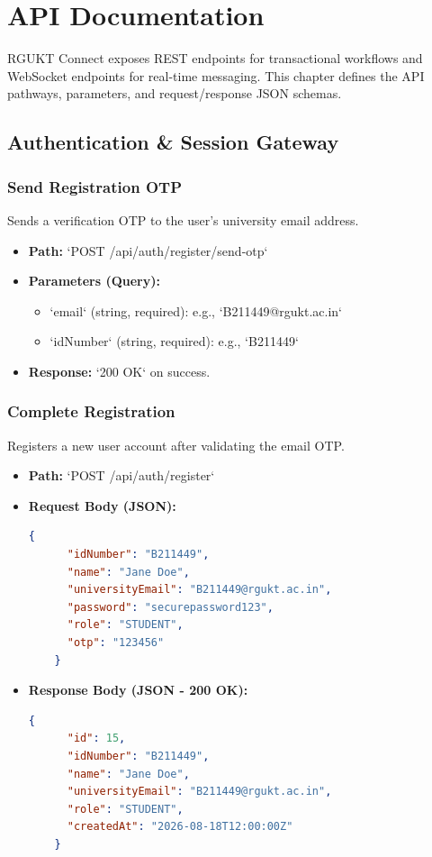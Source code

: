 \chapter{API Documentation}
\label{ch:api}

RGUKT Connect exposes REST endpoints for transactional workflows and WebSocket endpoints for real-time messaging. This chapter defines the API pathways, parameters, and request/response JSON schemas.

\section{Authentication \& Session Gateway}

\subsection{Send Registration OTP}
Sends a verification OTP to the user's university email address.
\begin{itemize}
    \item \textbf{Path:} `POST /api/auth/register/send-otp`
    \item \textbf{Parameters (Query):}
    \begin{itemize}
        \item `email` (string, required): e.g., `B211449@rgukt.ac.in`
        \item `idNumber` (string, required): e.g., `B211449`
    \end{itemize}
    \item \textbf{Response:} `200 OK` on success.
\end{itemize}

\subsection{Complete Registration}
Registers a new user account after validating the email OTP.
\begin{itemize}
    \item \textbf{Path:} `POST /api/auth/register`
    \item \textbf{Request Body (JSON):}
    \begin{lstlisting}[language=json]
    {
      "idNumber": "B211449",
      "name": "Jane Doe",
      "universityEmail": "B211449@rgukt.ac.in",
      "password": "securepassword123",
      "role": "STUDENT",
      "otp": "123456"
    }
    \end{lstlisting}
    \item \textbf{Response Body (JSON - 200 OK):}
    \begin{lstlisting}[language=json]
    {
      "id": 15,
      "idNumber": "B211449",
      "name": "Jane Doe",
      "universityEmail": "B211449@rgukt.ac.in",
      "role": "STUDENT",
      "createdAt": "2026-08-18T12:00:00Z"
    }
    \end{lstlisting}
\end{itemize}

